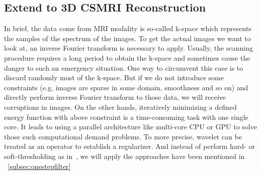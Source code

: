 
\subsection{Extend to 3D CSMRI Reconstruction}
In brief, the data come from MRI modality is so-called k-space which represents the samples of the spectrum of the images. 
To get the actual images we want to look at, an inverse Fourier transform is necessary to apply. 
Usually, the scanning procedure requires a long period to obtain the k-space and sometimes cause the danger to such an emergency situation. 
One way to circumvent this case is to discard randomly most of the k-space. 
But if we do not introduce some constraints (e.g, images are sparse in some domain, smoothness and so on) and directly perform inverse Fourier transform to those data, we will receive corruptions in images.
On the other hands, iteratively minimizing a defined energy function with above constraint is a time-consuming task with one single core.
It leads to using a parallel architecture like multi-core CPU or GPU to solve those such computational demand problems. 
To more precise, wavelet can be treated as an operator to establish a regularizer. And instead of perform hard- or soft-thresholding as in~\cite{donoho_-noising_1995}, we will apply the approaches have been mentioned in ~\ref{subsec:onestepfilter}
